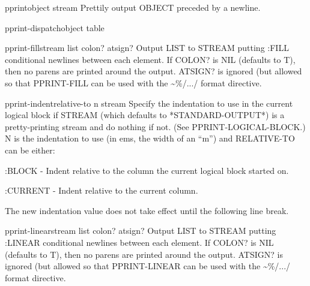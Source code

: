 \begin{function}{pprint}{object \op stream}{}{}
  Prettily output OBJECT preceded by a newline.
\end{function}

\begin{function}{pprint-dispatch}{object \op table}{}{}
  
\end{function}

\begin{function}{pprint-fill}{stream list \op colon? atsign?}{}{}
  Output LIST to STREAM putting :FILL conditional newlines between each
   element. If COLON? is NIL (defaults to T), then no parens are printed
   around the output. ATSIGN? is ignored (but allowed so that PPRINT-FILL
   can be used with the \~{}\%/.../ format directive.
\end{function}

\begin{function}{pprint-indent}{relative-to n \op stream}{}{}
  Specify the indentation to use in the current logical block if
STREAM (which defaults to *STANDARD-OUTPUT*) is a pretty-printing
stream and do nothing if not. (See PPRINT-LOGICAL-BLOCK.) N is the
indentation to use (in ems, the width of an ``m'') and RELATIVE-TO can
be either:

     :BLOCK - Indent relative to the column the current logical block
        started on.

     :CURRENT - Indent relative to the current column.

The new indentation value does not take effect until the following
line break.
\end{function}

\begin{function}{pprint-linear}{stream list \op colon? atsign?}{}{}
  Output LIST to STREAM putting :LINEAR conditional newlines between each
   element. If COLON? is NIL (defaults to T), then no parens are printed
   around the output. ATSIGN? is ignored (but allowed so that PPRINT-LINEAR
   can be used with the \~{}\%/.../ format directive.
\end{function}


